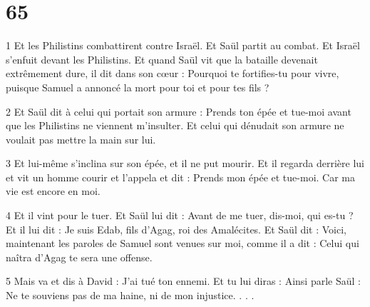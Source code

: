 \chapter{65}

\par 1 Et les Philistins combattirent contre Israël. Et Saül partit au combat. Et Israël s'enfuit devant les Philistins. Et quand Saül vit que la bataille devenait extrêmement dure, il dit dans son cœur : Pourquoi te fortifies-tu pour vivre, puisque Samuel a annoncé la mort pour toi et pour tes fils ?

\par 2 Et Saül dit à celui qui portait son armure : Prends ton épée et tue-moi avant que les Philistins ne viennent m'insulter. Et celui qui dénudait son armure ne voulait pas mettre la main sur lui.

\par 3 Et lui-même s'inclina sur son épée, et il ne put mourir. Et il regarda derrière lui et vit un homme courir et l'appela et dit : Prends mon épée et tue-moi. Car ma vie est encore en moi.

\par 4 Et il vint pour le tuer. Et Saül lui dit : Avant de me tuer, dis-moi, qui es-tu ? Et il lui dit : Je suis Edab, fils d'Agag, roi des Amalécites. Et Saül dit : Voici, maintenant les paroles de Samuel sont venues sur moi, comme il a dit : Celui qui naîtra d'Agag te sera une offense.

\par 5 Mais va et dis à David : J'ai tué ton ennemi. Et tu lui diras : Ainsi parle Saül : Ne te souviens pas de ma haine, ni de mon injustice. . . .



